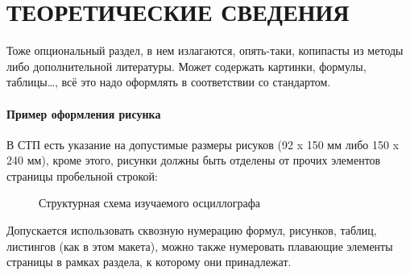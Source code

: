 \section{ТЕОРЕТИЧЕСКИЕ СВЕДЕНИЯ}

Тоже опциональный раздел, в нем излагаются, опять-таки, копипасты из методы либо
дополнительной литературы.
Может содержать картинки, формулы, таблицы\dots, всё это надо оформлять
в соответствии со стандартом.

\paragraph{Пример оформления рисунка} В СТП есть указание на допустимые размеры рисуков (92 x 150 мм либо 150 x 240 мм),
кроме этого, рисунки должны быть отделены от прочих элементов страницы пробельной строкой:
\begin{figure}[h!]
  \caption{Структурная схема изучаемого осциллографа}
\end{figure}

Допускается использовать сквозную нумерацию формул, рисунков, таблиц, листингов (как в этом макета),
можно также нумеровать плавающие элементы страницы в рамках раздела, к которому они принадлежат.

\newpage